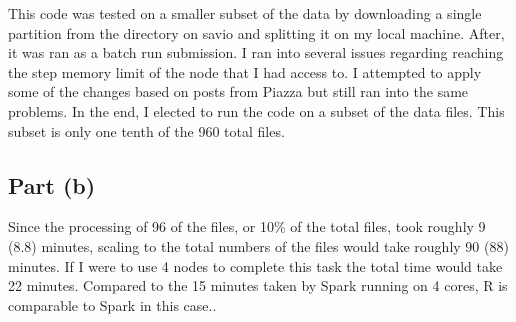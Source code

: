 \documentclass{article}\usepackage[]{graphicx}\usepackage[]{color}
\begin{document}
This code was tested on a smaller subset of the data by downloading a single partition from the directory on savio and splitting it on my local machine.  After, it was ran as a batch run submission.  I ran into several issues regarding reaching the step memory limit of the node that I had access to.  I attempted to apply some of the changes based on posts from Piazza but still ran into the same problems.  In the end, I elected to run the code on a subset of the data files.  This subset is only one tenth of the 960 total files.  
\subsection{Part (b)}
Since the processing of 96 of the files, or 10\% of the total files, took roughly 9 (8.8) minutes, scaling to the total numbers of the files would take roughly 90 (88) minutes.  If I were to use 4 nodes to complete this task the total time would take 22 minutes.  Compared to the 15 minutes taken by Spark running on 4 cores, R is comparable to Spark in this case..
\end{document}
